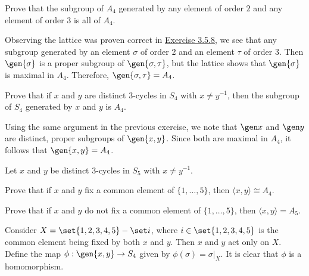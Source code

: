 \begin{problems}
\begin{sol}
    \end{sol}
    \item Prove that the subgroup of $A_4$ generated by any element of order $2$ and any element of order $3$ is all of $A_4$.
    \begin{sol}
        Observing the lattice was proven correct in \hyperref[ex3.5.8]{Exercise 3.5.8}, we see that any subgroup generated by an element $\sigma$ of order 2 and an element $\tau$ of order 3. Then $\gen{\sigma}$ is a proper subgroup of $\gen{\sigma, \tau}$, but the lattice shows that $\gen{\sigma}$ is maximal in $A_4$. Therefore, $\gen{\sigma, \tau} = A_4$.
    \end{sol}
    \item Prove that if $x$ and $y$ are distinct $3$-cycles in $S_4$ with $x \ne y^{-1}$, then the subgroup of $S_4$ generated by $x$ and $y$ is $A_4$.
    \begin{sol}
        Using the same argument in the previous exercise, we note that $\gen x$ and $\gen y$ are distinct, proper subgroups of $\gen{x, y}$. Since both are maximal in $A_4$, it follows that $\gen{x, y} = A_4$.
    \end{sol}
    \item Let $x$ and $y$ be distinct $3$-cycles in $S_5$ with $x\ne y^{-1}$.
    \begin{problems}
    \item Prove that if $x$ and $y$ fix a common element of $\{1,\dots,5\}$, then $\langle x,y\rangle \cong A_4$.
    \item Prove that if $x$ and $y$ do not fix a common element of $\{1,\dots,5\}$, then $\langle x,y\rangle = A_5$.
    \end{problems}
    \begin{solalph}
        \item Consider $X = \set{1, 2, 3, 4, 5} - \set i$, where $i \in \set{1, 2, 3, 4, 5}$ is the common element being fixed by both $x$ and $y$. Then $x$ and $y$ act only on $X$. Define the map $\phi : \gen{x, y} \to S_4$ given by $\phi(\sigma) = \sigma|_X$. It is clear that $\phi$ is a homomorphism. 
        

\end{solalph}
\end{problems}
